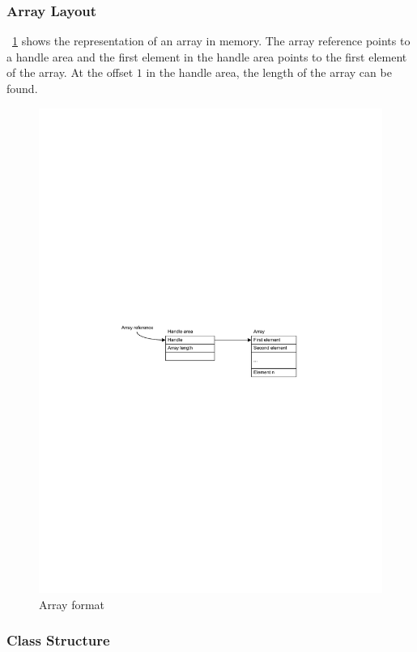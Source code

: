 \subsubsection{Array Layout}


\figurename~\ref{fig_jvm_array} shows the representation of an array
in memory. The array reference points to a handle area and the first
element in the handle area points to the first element of the array.
At the offset $1$ in the handle area, the length of the array can be
found.

\begin{figure}
    \centering
    \includegraphics[scale=\picscale]{jvm/jvm_array}
    \caption{Array format}
    \label{fig_jvm_array}
\end{figure}


\subsubsection{Class Structure}

